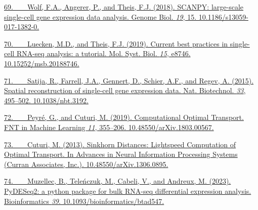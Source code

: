 \href{https://sciwheel.com/work/bibliography/4822624}{69.~  Wolf, F.A.,
Angerer, P., and Theis, F.J. (2018). SCANPY: large-scale single-cell
gene expression data analysis. Genome Biol. \emph{19}, 15.
10.1186/s13059-017-1382-0.}

\href{https://sciwheel.com/work/bibliography/7092677}{70.~  Luecken,
M.D., and Theis, F.J. (2019). Current best practices in single-cell
RNA-seq analysis: a tutorial. Mol. Syst. Biol. \emph{15}, e8746.
10.15252/msb.20188746.}

\href{https://sciwheel.com/work/bibliography/112055}{71.~  Satija, R.,
Farrell, J.A., Gennert, D., Schier, A.F., and Regev, A. (2015). Spatial
reconstruction of single-cell gene expression data. Nat. Biotechnol.
\emph{33}, 495--502. 10.1038/nbt.3192.}

\href{https://sciwheel.com/work/bibliography/7314344}{72.~  Peyré, G.,
and Cuturi, M. (2019). Computational Optimal Transport. FNT in Machine
Learning \emph{11}, 355--206. 10.48550/arXiv.1803.00567.}

\href{https://sciwheel.com/work/bibliography/18541642}{73.~  Cuturi, M.
(2013). Sinkhorn Distances: Lightspeed Computation of Optimal Transport.
In Advances in Neural Information Processing Systems (Curran Associates,
Inc.). 10.48550/arXiv.1306.0895.}

\href{https://sciwheel.com/work/bibliography/15335444}{74.~  Muzellec,
B., Teleńczuk, M., Cabeli, V., and Andreux, M. (2023). PyDESeq2: a
python package for bulk RNA-seq differential expression analysis.
Bioinformatics \emph{39}. 10.1093/bioinformatics/btad547.}

